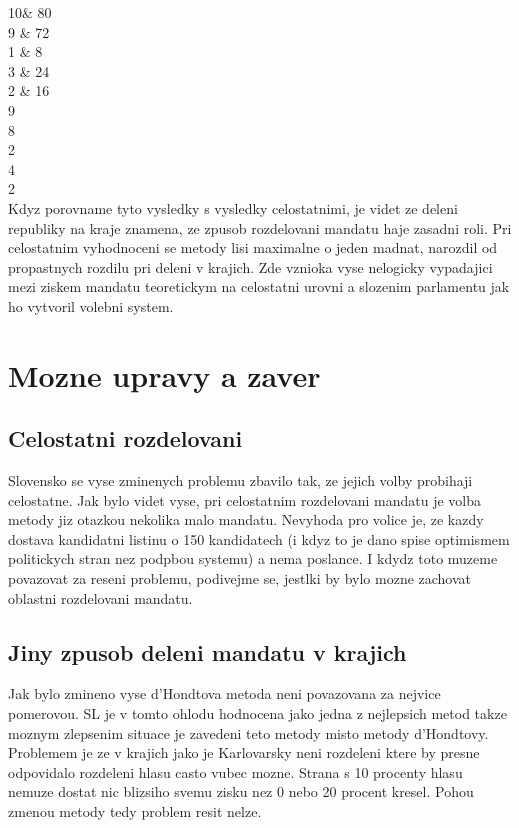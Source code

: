 \documentclass[12pt,a4paper]{report}
\begin{document}
10\& 80 \\
9 \& 72\\
1 \& 8\\
3 \& 24\\
2 \& 16\\

9\\
8\\
2\\
4\\
2\\

Kdyz porovname tyto vysledky s vysledky celostatnimi, je videt ze deleni republiky na kraje znamena, ze zpusob rozdelovani mandatu haje zasadni roli.
Pri celostatnim vyhodnoceni se metody lisi maximalne o jeden madnat, narozdil od propastnych rozdilu pri deleni v krajich.
Zde vznioka vyse nelogicky vypadajici mezi ziskem mandatu teoretickym na celostatni urovni a slozenim parlamentu jak ho vytvoril volebni system.

\chapter{Mozne upravy a zaver}

\section{Celostatni rozdelovani}
Slovensko se vyse zminenych problemu zbavilo tak, ze jejich volby probihaji celostatne.
Jak bylo videt vyse, pri celostatnim rozdelovani mandatu je volba metody jiz otazkou nekolika malo mandatu.
Nevyhoda pro volice je, ze kazdy dostava kandidatni listinu o 150 kandidatech (i kdyz to je dano spise optimismem politickych stran nez podpbou systemu) a nema  poslance.
I kdydz toto muzeme povazovat za reseni problemu, podivejme se, jestlki by bylo mozne zachovat oblastni rozdelovani mandatu.
\section{Jiny zpusob deleni mandatu v krajich}
Jak bylo zmineno vyse  %
d'Hondtova metoda neni povazovana za nejvice pomerovou.
SL je v tomto ohlodu hodnocena jako jedna z nejlepsich metod %
takze moznym zlepsenim situace je zavedeni teto metody misto metody d'Hondtovy.
Problemem je ze v krajich jako je Karlovarsky neni rozdeleni ktere by presne odpovidalo rozdeleni hlasu casto vubec mozne.
Strana s 10 procenty hlasu nemuze dostat nic blizsiho svemu zisku nez 0 nebo 20 procent kresel.
Pohou zmenou metody tedy problem resit nelze. 
\end{document}
